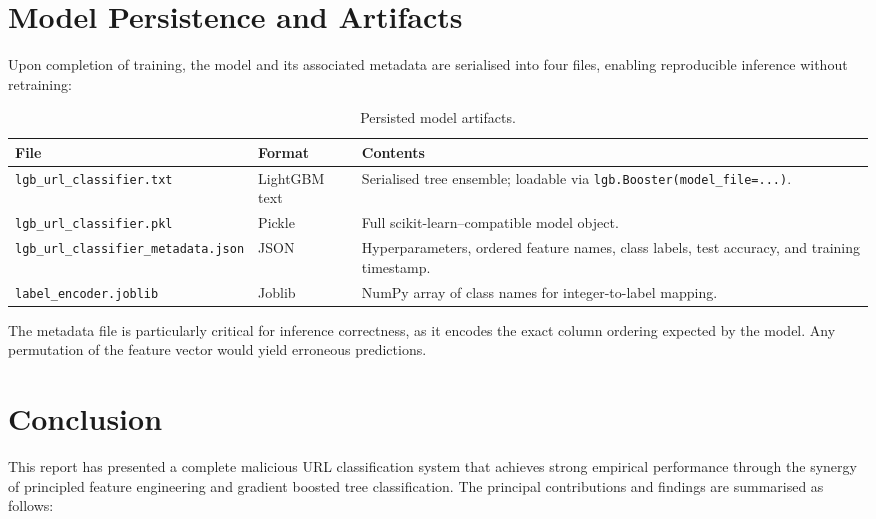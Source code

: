 \documentclass[a4paper,12pt]{article}
\begin{document}
\section{Model Persistence and Artifacts}
\label{sec:artifacts}

Upon completion of training, the model and its associated metadata are serialised into four files, enabling reproducible inference without retraining:

\begin{table}[H]
\centering
\caption{Persisted model artifacts.}
\label{tab:artifacts}
\begin{tabular}{llp{6cm}}
\toprule
\textbf{File} & \textbf{Format} & \textbf{Contents} \\
\midrule
\texttt{lgb\_url\_classifier.txt} & LightGBM text & Serialised tree ensemble; loadable via \texttt{lgb.Booster(model\_file=...)}. \\
\texttt{lgb\_url\_classifier.pkl} & Pickle & Full scikit-learn--compatible model object. \\
\texttt{lgb\_url\_classifier\_metadata.json} & JSON & Hyperparameters, ordered feature names, class labels, test accuracy, and training timestamp. \\
\texttt{label\_encoder.joblib} & Joblib & NumPy array of class names for integer-to-label mapping. \\
\bottomrule
\end{tabular}
\end{table}

The metadata file is particularly critical for inference correctness, as it encodes the exact column ordering expected by the model. Any permutation of the feature vector would yield erroneous predictions.

\section{Conclusion}
\label{sec:conclusion}

This report has presented a complete malicious URL classification system that achieves strong empirical performance through the synergy of principled feature engineering and gradient boosted tree classification. The principal contributions and findings are summarised as follows:
\end{document}
